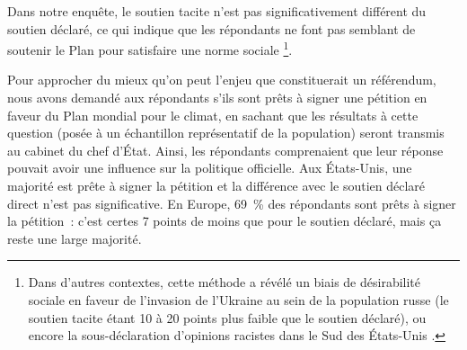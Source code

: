 \documentclass[a5paper,french,openany]{memoir}
\begin{document}
Dans notre enquête, le soutien tacite n'est pas significativement différent du soutien déclaré, ce qui indique que les répondants ne font pas semblant de soutenir le Plan pour satisfaire une norme sociale%
\footnote{Dans d'autres contextes, cette méthode a révélé un biais de désirabilité sociale en faveur de l'invasion de l'Ukraine au sein de la population russe (le soutien tacite étant 10 à 20 points plus faible que le soutien déclaré), ou encore la sous-déclaration d'opinions racistes dans le Sud des États-Unis \citep{kuklinski_racial_1997,chapkovski_solid_2022}.}. 

Pour approcher du mieux qu'on peut l'enjeu que constituerait un référendum, nous avons demandé aux répondants s'ils sont prêts à signer une pétition en faveur du Plan mondial pour le climat, en sachant que les résultats à cette question (posée à un échantillon représentatif de la population) seront transmis au cabinet du chef d'État. Ainsi, les répondants comprenaient que leur réponse pouvait avoir une influence sur la politique officielle. Aux États-Unis, une majorité est prête à signer la pétition et la différence avec le soutien déclaré direct n'est pas significative. En Europe, 69~\% des répondants sont prêts à signer la pétition~: c'est certes 7 points de moins que pour le soutien déclaré, mais ça reste une large majorité. 
\end{document}

